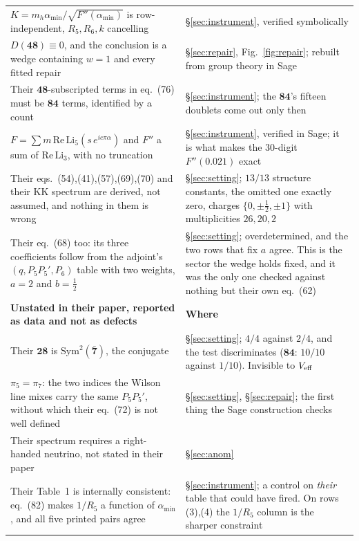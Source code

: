 \documentclass[11pt,a4paper]{article}
\newcommand{\rep}[1]{\mathbf{#1}}
\newcommand{\amin}{\alpha_{\min}}
\begin{document}
\begin{longtable}{p{}p{}}
$K=m_h\amin/\sqrt{F''(\amin)}$ is row-independent, $R_5,R_6,k$ cancelling & \S\ref{sec:instrument},
verified symbolically\\
$D(\rep{48})\equiv0$, and the conclusion is a wedge containing $w=1$ and every fitted repair &
\S\ref{sec:repair}, Fig.~\ref{fig:repair}; rebuilt from group theory in Sage\\
Their $\rep{48}$-subscripted terms in eq.~(76) must be $\rep{84}$ terms, identified by a count &
\S\ref{sec:instrument}; the $\rep{84}$'s fifteen doublets come out only then\\
$F=\sum m\,\mathrm{Re}\,\mathrm{Li}_5(s\,e^{ic\pi\alpha})$ and $F''$ a sum of
$\mathrm{Re}\,\mathrm{Li}_3$, with no truncation & \S\ref{sec:instrument}, verified in Sage; it is
what makes the $30$-digit $F''(0.021)$ exact\\
Their eqs.~(54),(41),(57),(69),(70) and their KK spectrum are derived, not assumed, and nothing in
them is wrong & \S\ref{sec:setting}; $13/13$ structure constants, the omitted one exactly zero,
charges $\{0,\pm\tfrac12,\pm1\}$ with multiplicities $26,20,2$\\
Their eq.~(68) too: its three coefficients follow from the adjoint's
$(q,P_5P_5',P_6)$ table with two weights, $a=2$ and $b=\tfrac12$ &
\S\ref{sec:setting}; overdetermined, and the two rows that fix $a$ agree. This is the sector the
wedge holds fixed, and it was the only one checked against nothing but their own eq.~(62)\\
\midrule
\rowcolor{hdrblue!10}\textbf{Unstated in their paper, reported as data and not as defects} &
\textbf{Where}\\
\midrule
Their $\rep{28}$ is $\mathrm{Sym}^2(\rep{\bar7})$, the conjugate & \S\ref{sec:setting}; $4/4$ against
$2/4$, and the test discriminates ($\rep{84}$: $10/10$ against $1/10$). Invisible to $V_{\rm eff}$\\
$\pi_5=\pi_7$: the two indices the Wilson line mixes carry the same $P_5P_5'$, without which their
eq.~(72) is not well defined & \S\ref{sec:setting}, \S\ref{sec:repair}; the first thing the Sage
construction checks\\
Their spectrum requires a right-handed neutrino, not stated in their paper &
\S\ref{sec:anom}\\
Their Table~1 is internally consistent: eq.~(82) makes $1/R_5$ a function of $\amin$, and all five
printed pairs agree & \S\ref{sec:instrument}; a control on \emph{their} table that could have fired.
On rows (3),(4) the $1/R_5$ column is the sharper constraint\\

\end{longtable}
\end{document}
